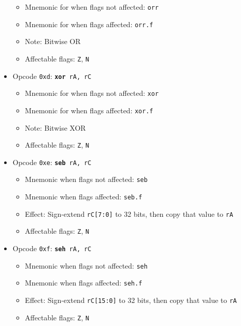 \documentclass{article}
\begin{document}
\begin{itemize}
\begin{itemize}
			\item Mnemonic for when flags not affected:  \texttt{orr}
			\item Mnemonic for when flags affected:  \texttt{orr.f}
			\item Note:  Bitwise OR
			\item Affectable flags:
				\texttt{Z}, \texttt{N}
		\end{itemize}
		\item Opcode \texttt{0xd}:
			\texttt{\textbf{xor} rA, rC}
		\begin{itemize}
			\item Mnemonic for when flags not affected:  \texttt{xor}
			\item Mnemonic for when flags affected:  \texttt{xor.f}
			\item Note:  Bitwise XOR
			\item Affectable flags:
				\texttt{Z}, \texttt{N}
		\end{itemize}
		\item Opcode \texttt{0xe}:
			\texttt{\textbf{seb} rA, rC}
		\begin{itemize}
			\item Mnemonic when flags not affected:  \texttt{seb}
			\item Mnemonic when flags affected:  \texttt{seb.f}
			\item Effect:
				Sign-extend \texttt{rC[7:0]} to 32 bits, then copy that
				value to \texttt{rA}
			\item Affectable flags:
				\texttt{Z}, \texttt{N}
		\end{itemize}
		\item Opcode \texttt{0xf}:
			\texttt{\textbf{seh} rA, rC}
		\begin{itemize}
			\item Mnemonic when flags not affected:  \texttt{seh}
			\item Mnemonic when flags affected:  \texttt{seh.f}
			\item Effect:
				Sign-extend \texttt{rC[15:0]} to 32 bits, then copy that
				value to \texttt{rA}
			\item Affectable flags:
				\texttt{Z}, \texttt{N}
		\end{itemize}

\end{itemize}
\end{document}
